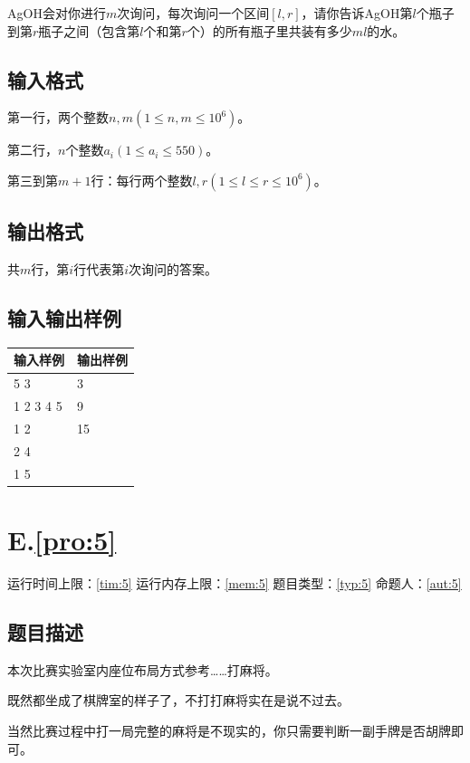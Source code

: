 \documentclass[
	lang=cn,
	color=green
]{elegantbook}
\begin{document}
AgOH会对你进行$m$次询问，每次询问一个区间$[l,r]$，请你告诉AgOH第$l$个瓶子到第$r$瓶子之间（包含第$l$个和第$r$个）的所有瓶子里共装有多少$ml$的水。

\section*{输入格式}
第一行，两个整数$n,m(1 \leq n,m \leq 10^6)$。

第二行，$n$个整数$a_i(1 \leq a_i \leq 550)$。

第三到第$m+1$行：每行两个整数$l,r(1 \leq l \leq r \leq 10^6)$。

\section*{输出格式}
共$m$行，第$i$行代表第$i$次询问的答案。

\section*{输入输出样例}
\begin{tabularx}{450pt}{X|X}
	\toprule
	输入样例  & 输出样例 \\
	\midrule
	5 3       & 3        \\
	1 2 3 4 5 & 9        \\
	1 2       & 15       \\
	2 4       &          \\
	1 5       &          \\
	\bottomrule
\end{tabularx}

\newpage
\chapter*{E.\quad \ref*{pro:5}}
\begin{center}
	运行时间上限：\ref*{tim:5} \quad 运行内存上限：\ref*{mem:5} \quad 题目类型：\ref*{typ:5} \quad 命题人：\ref*{aut:5}
\end{center}

\section*{题目描述}
本次比赛实验室内座位布局方式参考……打麻将。

既然都坐成了棋牌室的样子了，不打打麻将实在是说不过去。

当然比赛过程中打一局完整的麻将是不现实的，你只需要判断一副手牌是否胡牌即可。
\end{document}
